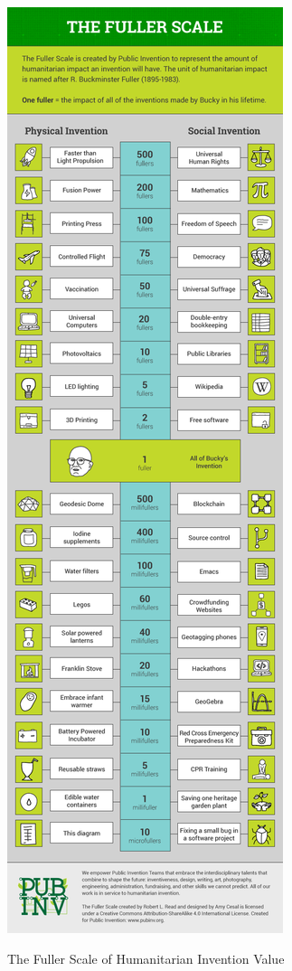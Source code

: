 \documentclass[
	fontsize=10pt, %
	twoside=false, %
	secnumdepth=1, %
]{kaobook}
\begin{document}
\begin{marginfigure}
  \includegraphics{figures/FullerScale.png}
  \caption{The Fuller Scale of Humanitarian Invention Value}
\end{marginfigure}
\end{document}

